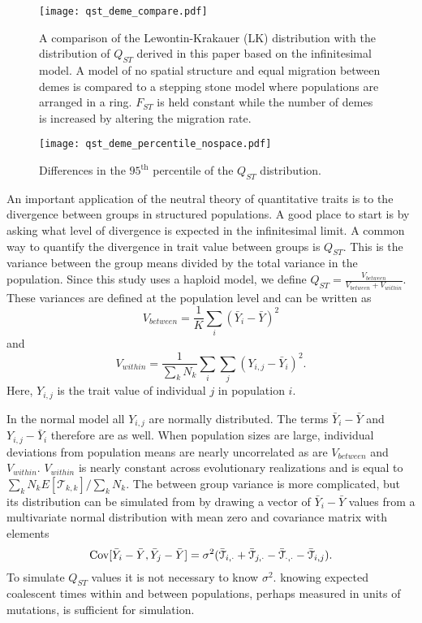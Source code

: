 \begin{figure}
  \centering
  \texttt{[image: qst\_deme\_compare.pdf]}
  \caption{A comparison of the Lewontin-Krakauer (LK) distribution with the
    distribution of $Q_{ST}$ derived in this paper based on the infinitesimal
    model. A model of no spatial structure and equal migration between demes is
    compared to a stepping stone model where populations are arranged in a ring.
    $F_{ST}$ is held constant while the number of demes is increased by altering
    the migration rate.}
  \label{fig:qst_deme}
\end{figure}
\begin{figure}
  \centering
  \texttt{[image: qst\_deme\_percentile\_nospace.pdf]}
  \caption{Differences in the $95^{\mathrm{th}}$ percentile of the $Q_{ST}$
    distribution.}
  \label{fig:qst_perc}
\end{figure}
An important application of the neutral theory of quantitative traits is to the
divergence between groups in structured populations. A good place to start is by
asking what level of divergence is expected in the infinitesimal limit. A common
way to quantify the divergence in trait value between groups is $Q_{ST}$. This
is the variance between the group means divided by the total variance in the
population. Since this study uses a haploid model, we define
$Q_{ST} = \frac{V_{between}}{V_{between} + V_{within}}$. These variances are
defined at the population level and can be written as
\begin{equation*}
  V_{between} = \frac{1}{K} \sum_i \left( \bar{Y}_i - \bar{Y} \right)^2
\end{equation*}
and
\begin{equation*}
  V_{within} = \frac{1}{\sum_k N_k} \sum_i \sum_j \left( Y_{i,j} - \bar{Y}_i \right)^2.
\end{equation*}
Here, $Y_{i,j}$ is the trait value of individual $j$ in population $i$.

In the normal model all $Y_{i,j}$ are normally distributed. The terms
$\bar{Y}_{i} - \bar{Y}$ and $Y_{i,j} - \bar{Y}_i$ therefore are as well. When
population sizes are large, individual deviations from population means are
nearly uncorrelated as are $V_{between}$ and $V_{within}$. $V_{within}$ is
nearly constant across evolutionary realizations and is equal to
$\sum_k N_k E[\mathcal{T}_{k,k}] / \sum_k N_k$. The between group variance is more
complicated, but its distribution can be simulated from by drawing a vector of
$\bar{Y}_{i} - \bar{Y}$ values from a multivariate normal distribution with mean
zero and covariance matrix with elements
\begin{equation}
  \mathrm{Cov}[\bar{Y}_{i} - \bar{Y}, \bar{Y}_{j} - \bar{Y}] =
  \sigma^2(\bar{\mathcal{T}}_{i,\cdot} + \bar{\mathcal{T}}_{j,\cdot} -
  \bar{\mathcal{T}}_{\cdot,\cdot} - \bar{\mathcal{T}}_{i,j}).
\end{equation}
To simulate $Q_{ST}$ values it is not necessary to know $\sigma^2$. knowing
expected coalescent times within and between populations, perhaps measured in
units of mutations, is sufficient for simulation.

